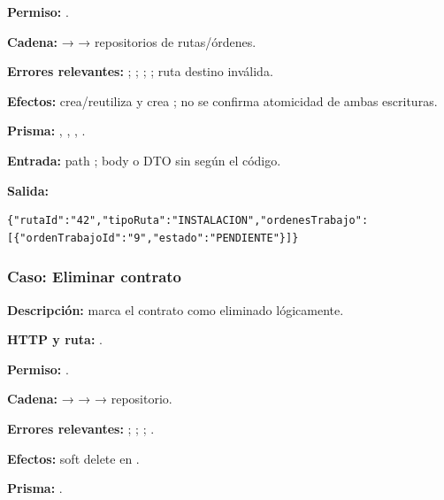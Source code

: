 \textbf{Permiso:} \texttt{}.  

\textbf{Cadena:} \texttt{} → \texttt{} → repositorios de rutas/órdenes.  

\textbf{Errores relevantes:} \texttt{}; \texttt{}; \texttt{}; \texttt{}; ruta destino inválida.  

\textbf{Efectos:} crea/reutiliza \texttt{} y crea \texttt{}; no se confirma atomicidad de ambas escrituras.  

\textbf{Prisma:} \texttt{}, \texttt{}, \texttt{}, \texttt{}.  

\textbf{Entrada:} path \texttt{}; body \texttt{} o DTO sin \texttt{} según el código.  

\textbf{Salida:}


\begin{lstlisting}
{"rutaId":"42","tipoRuta":"INSTALACION","ordenesTrabajo":[{"ordenTrabajoId":"9","estado":"PENDIENTE"}]}
\end{lstlisting}


\subsubsection{Caso: Eliminar contrato}


\textbf{Descripción:} marca el contrato como eliminado lógicamente.  

\textbf{HTTP y ruta:} \texttt{}.  

\textbf{Permiso:} \texttt{}.  

\textbf{Cadena:} \texttt{} → \texttt{} → \texttt{} → repositorio.  

\textbf{Errores relevantes:} \texttt{}; \texttt{}; \texttt{}; \texttt{}.  

\textbf{Efectos:} soft delete en \texttt{}.  

\textbf{Prisma:} \texttt{}.  

